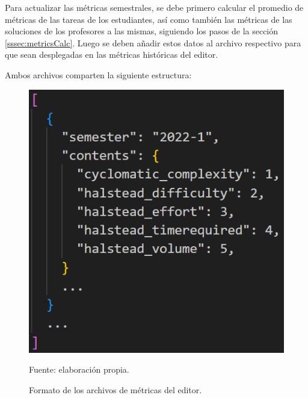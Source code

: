 \documentclass[letterpaper,12pt]{article}
\begin{document}
Para actualizar las métricas semestrales, se debe primero calcular el promedio de métricas de las tareas de los estudiantes, así como también las métricas de las soluciones de los profesores a las mismas, siguiendo los pasos de la sección \ref{sssec:metricsCalc}. Luego se deben añadir estos datos al archivo respectivo para que sean desplegadas en las métricas históricas del editor.

Ambos archivos comparten la siguiente estructura:
\begin{figure}[H]
  \centering
  \includegraphics[width=1\textwidth]{figures/metrics1.png}
  \caption{Formato de los archivos de métricas del editor.} Fuente: elaboración propia.
  \label{img:metrics1}
\end{figure}
\end{document}
